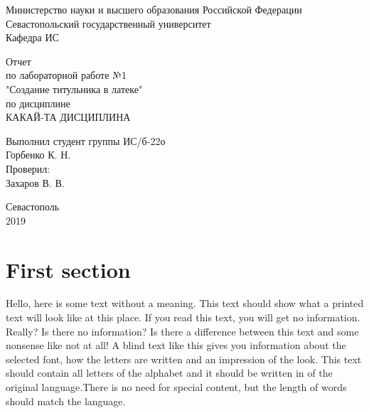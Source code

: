 \documentclass[a4paper,14pt]{extarticle}
\newcommand{\mylabnumber}{1}
\newcommand{\mylabtitle}{Создание титульника в латеке}
\newcommand{\mysubject}{Какай-та дисциплина}
\begin{document}
    \begin{titlepage}
        
        \thispagestyle{empty}
        
        \begin{center}
            
            Министерство науки и высшего образования Российской Федерации \\
            Севастопольский государственный университет \\
            Кафедра ИС
            
            \vfill
            \large{
                Отчет \\
                по лабораторной работе №\mylabnumber \\
                "\mylabtitle" \\
                по дисциплине \\
                \MakeTextUppercase{\mysubject}
            }

        \end{center}

        \vspace{1cm}

        \noindent\hspace{7.5cm} Выполнил студент группы ИС/б-22о \\
        \null\hspace{7.5cm} Горбенко К. Н. \\
        \null\hspace{7.5cm} Проверил: \\
        \null\hspace{7.5cm} Захаров В. В.

        \vfill

        \begin{center}
            Севастополь \\
            2019
        \end{center}

    \end{titlepage}

    \section{First section}

    Hello, here is some text without a meaning.  This text should show what 
    a printed text will look like at this place.  If you read this text, 
    you will get no information.  Really?  Is there no information?  Is there 
    a difference between this text and some nonsense like not at all!  A 
    blind text like this gives you information about the selected font, how 
    the letters are written and an impression of the look.  This text should
    contain all letters of the alphabet and it should be written in of the
    original language.There is no need for special content, but the length of
    words should match the language.
\end{document}
